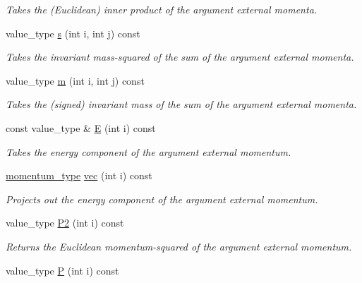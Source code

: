 \begin{DoxyCompactItemize}
\begin{DoxyCompactList}\small\item\em Takes the (Euclidean) inner product of the argument external momenta. \end{DoxyCompactList}\item 
value\+\_\+type \hyperlink{a00451_a6e5851bcdc5d86235f1348aea57b995a}{s} (int i, int j) const 
\begin{DoxyCompactList}\small\item\em Takes the invariant mass-\/squared of the sum of the argument external momenta. \end{DoxyCompactList}\item 
value\+\_\+type \hyperlink{a00451_ae7b1f38ebb163dcb4dc0b7f2928698a4}{m} (int i, int j) const 
\begin{DoxyCompactList}\small\item\em Takes the (signed) invariant mass of the sum of the argument external momenta. \end{DoxyCompactList}\item 
\hypertarget{a00451_a70eff6fadc1a889d712f5d95e73fb912}{}const value\+\_\+type \& \hyperlink{a00451_a70eff6fadc1a889d712f5d95e73fb912}{E} (int i) const \label{a00451_a70eff6fadc1a889d712f5d95e73fb912}

\begin{DoxyCompactList}\small\item\em Takes the energy component of the argument external momentum. \end{DoxyCompactList}\item 
\hypertarget{a00451_acee376677b0f549028eb3e8fb66f3e3c}{}\hyperlink{a00579}{momentum\+\_\+type} \hyperlink{a00451_acee376677b0f549028eb3e8fb66f3e3c}{vec} (int i) const \label{a00451_acee376677b0f549028eb3e8fb66f3e3c}

\begin{DoxyCompactList}\small\item\em Projects out the energy component of the argument external momentum. \end{DoxyCompactList}\item 
\hypertarget{a00451_a98c2381b3d5e714373d0351d2a20203d}{}value\+\_\+type \hyperlink{a00451_a98c2381b3d5e714373d0351d2a20203d}{P2} (int i) const \label{a00451_a98c2381b3d5e714373d0351d2a20203d}

\begin{DoxyCompactList}\small\item\em Returns the Euclidean momentum-\/squared of the argument external momentum. \end{DoxyCompactList}\item 
\hypertarget{a00451_aa564f96d3a4e3caf1fb7cd52dc69de76}{}value\+\_\+type \hyperlink{a00451_aa564f96d3a4e3caf1fb7cd52dc69de76}{P} (int i) const \label{a00451_aa564f96d3a4e3caf1fb7cd52dc69de76}


\end{DoxyCompactItemize}
